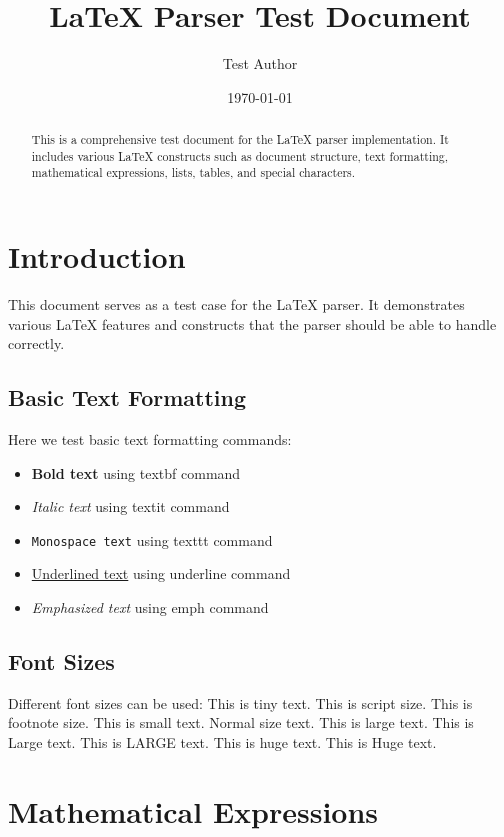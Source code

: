 \documentclass[12pt,a4paper]{article}
\title{LaTeX Parser Test Document}
\author{Test Author}
\date{\today}
\begin{document}
\maketitle

\begin{abstract}
This is a comprehensive test document for the LaTeX parser implementation. It includes various LaTeX constructs such as document structure, text formatting, mathematical expressions, lists, tables, and special characters.
\end{abstract}

\tableofcontents

\section{Introduction}

This document serves as a test case for the LaTeX parser. It demonstrates various LaTeX features and constructs that the parser should be able to handle correctly.

\subsection{Basic Text Formatting}

Here we test basic text formatting commands:
\begin{itemize}
    \item \textbf{Bold text} using textbf command
    \item \textit{Italic text} using textit command
    \item \texttt{Monospace text} using texttt command
    \item \underline{Underlined text} using underline command
    \item \emph{Emphasized text} using emph command
\end{itemize}

\subsection{Font Sizes}

Different font sizes can be used:
{\tiny This is tiny text.}
{\scriptsize This is script size.}
{\footnotesize This is footnote size.}
{\small This is small text.}
Normal size text.
{\large This is large text.}
{\Large This is Large text.}
{\LARGE This is LARGE text.}
{\huge This is huge text.}
{\Huge This is Huge text.}

\section{Mathematical Expressions}
\end{document}
